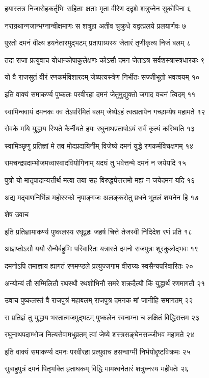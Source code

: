 हयास्तत्र निजारोहकर्तृभिः सहिताः क्षताः
मृता वीरेण ददृशे शत्रुघ्नेन सुकोपिना ६

नरान्रथान्गजान्भग्नान्वीक्षमाणः स शत्रुहा
अतीव चुक्रुधे यद्वत्प्रलये प्रलयार्णवः ७

पुरतो दमनं वीक्ष्य हयनेतारमुद्भटम्
प्रतापाग्र्यस्य जेतारं तृणीकृत्य निजं बलम् ८

तदा राजा प्रत्युवाच योधान्कोपाकुलेक्षणः
कोऽसौ दमन जेताऽत्र सर्वशस्त्रास्त्रधारकः ९

यो वै राजसुतं वीरं रणकर्मविशारदम्
जेष्यत्यस्त्रेण निर्भीतः सज्जीभूतो भवत्वयम् १०

इति वाक्यं समाकर्ण्य पुष्कलः परवीरहा
दमनं जेतुमुद्युक्तो जगाद वचनं त्विदम् ११

स्वामिन्क्वायं दमनकः क्व तेऽपरिमितं बलम्
जेष्येऽहं त्वत्प्रतापेन गच्छाम्येष महामते १२

सेवके मयि युद्धाय स्थिते कैर्नीयते हयः
रघुनाथप्रतापोऽयं सर्वं कृत्यं करिष्यति १३

स्वामिञ्छृणु प्रतिज्ञां मे तव मोदप्रदायिनीम्
विजेष्ये दमनं युद्धे रणकर्मविचक्षणम् १४

रामचन्द्रपदाम्भोजमध्वास्वादवियोगिनाम्
यदघं तु भवेत्तन्मे दमनं न जयेयदि १५

पुत्रो यो मातृपादान्यत्तीर्थं मत्वा तया सह
विरुद्ध्येत्तत्तमो मह्यं न जयेदमनं यदि १६

अद्य मद्बाणनिर्भिन्न महोरस्को नृपाङ्गजः
अलङ्करोतु प्रधने भूतलं शयनेन हि १७

शेष उवाच

इति प्रतिज्ञामाकर्ण्य पुष्कलस्य रघूद्वहः
जहर्ष चित्ते तेजस्वी निदिदेश रणं प्रति १८

आज्ञप्तोऽसौ ययौ सैन्यैर्बहुभिः परिवारितः
यत्रास्ते दमनो राजपुत्रः शूरकुलोद्भवः १९

दमनोऽपि तमाज्ञाय ह्यागतं रणमण्डले
प्रत्युज्जगाम वीराग्र्यः स्वसैन्यपरिवारितः २०

अन्योन्यं तौ सम्मिलितौ रथस्थौ रथशोभिनौ
समरे शक्रदैत्यौ किं युद्धार्थं रणमागतौ २१

उवाच पुष्कलस्तं वै राजपुत्रं महाबलम्
राजपुत्र दमनक मां जानीहि समागतम् २२

स प्रतिज्ञं तु युद्धाय भरतात्मजमुद्भटम्
पुष्कलेन स्वनाम्ना च लक्षितं विद्धिसत्तम २३

रघुनाथपदाम्भोज नित्यसेवामधुव्रतम्
त्वां जेष्ये शस्त्रसङ्घेनसज्जीभव महामते २४

इति वाक्यं समाकर्ण्य दमनः परवीरहा
प्रत्युवाच हसन्वाग्मी निर्भयोद्दृष्टविक्रमः २५

सुबाहुपुत्रं दमनं पितृभक्ति हृताघकम्
विद्धि मामश्वनेतारं शत्रुघ्नस्य महीपतेः २६

